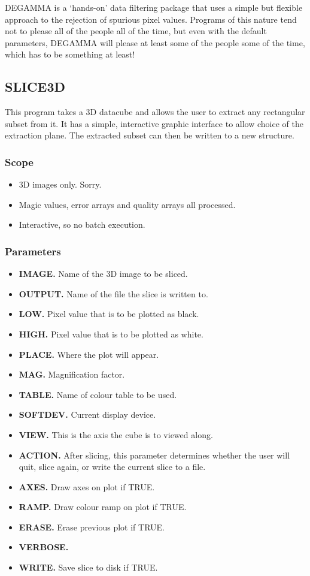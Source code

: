 DEGAMMA is a `hands-on' data filtering package that uses a simple but flexible
approach to the rejection of spurious pixel values. Programs of
this nature tend not to please all of the people all of the time, but even
with the default parameters, DEGAMMA will please at least some of the people
some of the time, which has to be something at least!

\subsection{SLICE3D}

This program takes a 3D datacube and allows the user to extract any rectangular
subset from it. It has a simple, interactive graphic interface to allow choice
of the extraction plane. The extracted subset can then be written to a new
structure.

\subsubsection{Scope}

\begin{itemize}
\item 3D images only. Sorry.
\item Magic values, error arrays and quality arrays all processed.
\item Interactive, so no batch execution.
\end{itemize}


\subsubsection{Parameters}

\begin{itemize}
\item {\bf IMAGE.} Name of the 3D image to be sliced.
\item {\bf OUTPUT.} Name of the file the slice is written to.
\item {\bf LOW.} Pixel value that is to be plotted as black.
\item {\bf HIGH.} Pixel value that is to be plotted as white.
\item {\bf PLACE.} Where the plot will appear.
\item {\bf MAG.} Magnification factor.
\item {\bf TABLE.} Name of colour table to be used.
\item {\bf SOFTDEV.} Current display device.
\item {\bf VIEW.} This is the axis the cube is to viewed along.
\item {\bf ACTION.} After slicing, this parameter determines whether the user
will quit, slice again, or write the current slice to a file.
\item {\bf AXES.} Draw axes on plot if TRUE.
\item {\bf RAMP.} Draw colour ramp on plot if TRUE.
\item {\bf ERASE.} Erase previous plot if TRUE.
\item {\bf VERBOSE.}
\item {\bf WRITE.} Save slice to disk if TRUE.
\end {itemize}

